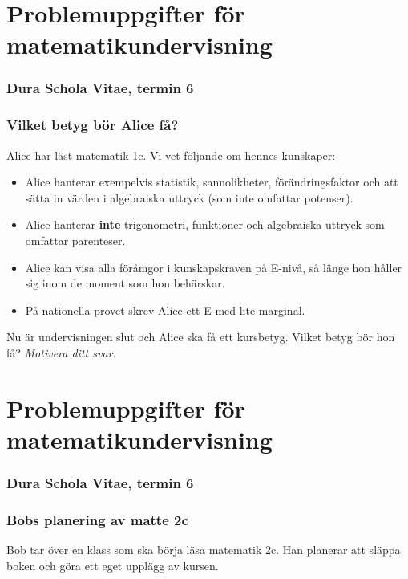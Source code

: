\part*{Problemuppgifter för matematikundervisning}

\section{Dura Schola Vitae, termin 6}

\setcounter{section}{0}
\section{Vilket betyg bör Alice få?}
Alice har läst matematik 1c. Vi vet följande om hennes kunskaper:

\begin{itemize}
  \item Alice hanterar exempelvis statistik, sannolikheter, förändringsfaktor och att sätta in värden i algebraiska uttryck (som inte omfattar potenser).
  \item Alice hanterar \textbf{inte} trigonometri, funktioner och algebraiska uttryck som omfattar parenteser.
  \item Alice kan visa alla föråmgor i kunskapskraven på E-nivå, så länge hon håller sig inom de moment som hon behärskar.
  \item På nationella provet skrev Alice ett E med lite marginal.
\end{itemize}

\noindent Nu är undervisningen slut och Alice ska få ett kursbetyg. Vilket betyg bör hon få? \emph{Motivera ditt svar.}



\newpage
\part*{Problemuppgifter för matematikundervisning}

\section{Dura Schola Vitae, termin 6}

\section{Bobs planering av matte 2c}
Bob tar över en klass som ska börja läsa matematik 2c. Han planerar att släppa boken och göra ett eget upplägg av kursen.

